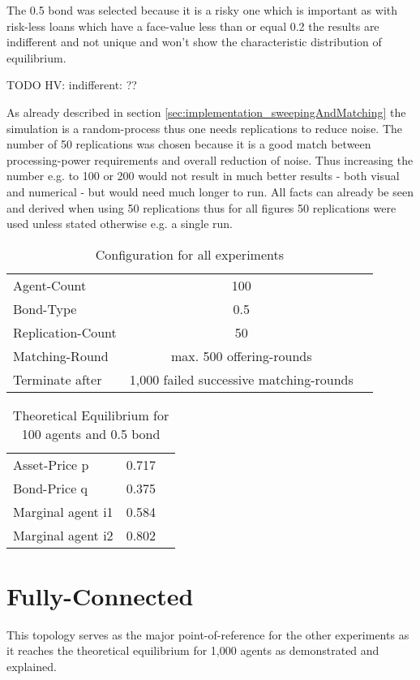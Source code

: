 \documentclass[Bachelorarbeit.tex]{subfiles}
\begin{document}
\medskip

The 0.5 bond was selected because it is a risky one which is important as with risk-less loans which have a face-value less than or equal 0.2 the results are indifferent and not unique and won't show the characteristic distribution of equilibrium.

TODO HV: indifferent: ??

\medskip

As already described in section \ref{sec:implementation_sweepingAndMatching} the simulation is a random-process thus one needs replications to reduce noise. The number of 50 replications was chosen because it is a good match between processing-power requirements and overall reduction of noise. Thus increasing the number e.g. to 100 or 200 would not result in much better results - both visual and numerical - but would need much longer to run. All facts can already be seen and derived when using 50 replications thus for all figures 50 replications were used unless stated otherwise e.g. a single run.

\begin{table}[H]
	\centering
	\caption{Configuration for all experiments}
	\begin{tabular} { l c r }
		\hline
		Agent-Count & 100 \\
		Bond-Type & 0.5 \\
		Replication-Count & 50 \\
		Matching-Round & max. 500 offering-rounds \\
		Terminate after & 1,000 failed successive matching-rounds \\
		\hline
	\end{tabular}
\end{table}

\begin{table}[H]
	\centering
	\caption{Theoretical Equilibrium for 100 agents and 0.5 bond}
	\begin{tabular} { l c r }
		\hline
		Asset-Price p & 0.717 \\
		Bond-Price q & 0.375 \\
		Marginal agent i1 & 0.584 \\
		Marginal agent i2 & 0.802 \\
		\hline
	\end{tabular}
	\label{tab:theoretical_equilibrium_100Agents_05Bond}
\end{table}

\section{Fully-Connected}
This topology serves as the major point-of-reference for the other experiments as it reaches the theoretical equilibrium for 1,000 agents as demonstrated and explained.
\end{document}
